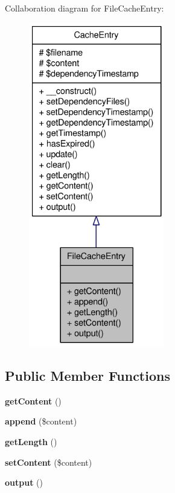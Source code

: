 Collaboration diagram for FileCacheEntry:\nopagebreak
\begin{figure}[H]
\begin{center}
\leavevmode
\includegraphics[height=400pt]{classFileCacheEntry__coll__graph}
\end{center}
\end{figure}
\subsection*{Public Member Functions}
\begin{DoxyCompactItemize}
\item 
\hypertarget{classFileCacheEntry_a143f518374598ddff649d8fb96fc6ccc}{
{\bfseries getContent} ()}
\label{classFileCacheEntry_a143f518374598ddff649d8fb96fc6ccc}

\item 
\hypertarget{classFileCacheEntry_a776f925ee61fb766ba9ba8582a518ea6}{
{\bfseries append} (\$content)}
\label{classFileCacheEntry_a776f925ee61fb766ba9ba8582a518ea6}

\item 
\hypertarget{classFileCacheEntry_a507128cf5ab3058304897646a311176b}{
{\bfseries getLength} ()}
\label{classFileCacheEntry_a507128cf5ab3058304897646a311176b}

\item 
\hypertarget{classFileCacheEntry_ae63e9a84d697e8e3f6af0f866a7fff18}{
{\bfseries setContent} (\$content)}
\label{classFileCacheEntry_ae63e9a84d697e8e3f6af0f866a7fff18}

\item 
\hypertarget{classFileCacheEntry_acfce6a2d1a2a8e47560d711e6fe5931c}{
{\bfseries output} ()}
\label{classFileCacheEntry_acfce6a2d1a2a8e47560d711e6fe5931c}

\end{DoxyCompactItemize}


